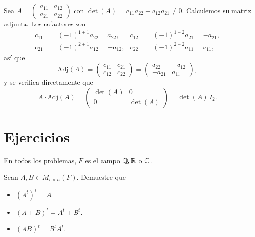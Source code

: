 \documentclass[12pt,a4paper]{book}
\newcommand{\parentesis}[1]{\left(#1\right)}
\begin{document}
    \begin{ejemplo}
    \label{ej:44}
        Sea $A = \begin{pmatrix} a_{11} & a_{12} \\ a_{21} & a_{22} \end{pmatrix}$ con $\det(A) = a_{11}a_{22} - a_{12}a_{21} \neq 0$. Calculemos su matriz adjunta. Los cofactores son
        \begin{align*}
            c_{11} & = (-1)^{1+1} a_{22} = a_{22}, & c_{12} & = (-1)^{1+2} a_{21} = -a_{21}, \\
            c_{21} & = (-1)^{2+1} a_{12} = -a_{12}, & c_{22} & = (-1)^{2+2} a_{11} = a_{11},
        \end{align*}
        así que
        \begin{equation*}
            \text{Adj}(A) = \begin{pmatrix} c_{11} & c_{21} \\ c_{12} & c_{22} \end{pmatrix} = \begin{pmatrix} a_{22} & -a_{12} \\ -a_{21} & a_{11} \end{pmatrix},
        \end{equation*}
        y se verifica directamente que
        \begin{equation*}
            A \cdot \text{Adj}(A) = \begin{pmatrix} \det(A) & 0 \\ 0 & \det(A) \end{pmatrix} = \det(A) \, I_{2}.
        \end{equation*}
    \end{ejemplo}

    
    
    
    

    \section{Ejercicios}

    En todos los problemas, $F$ es el campo $\mathbb{Q}, \mathbb{R}$ o $\mathbb{C}$.

    \begin{ejercicio}
        Sean $A, B \in M_{n \times n}(F)$. Demuestre que
        \begin{itemize}
            \item[(a)] $\parentesis{A^{t}}^{t} = A$.
            \item[(b)] $\parentesis{A + B}^{t} = A^{t} + B^{t}$.
            \item[(c)] $\parentesis{AB}^{t} = B^{t} A^{t}$.
        \end{itemize}
    \end{ejercicio}
\end{document}

